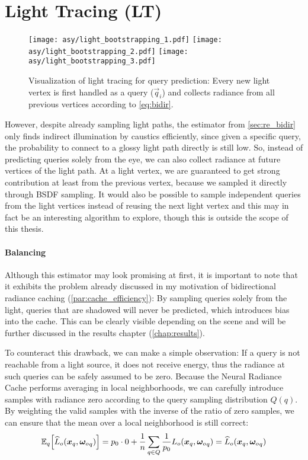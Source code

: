 \section{Light Tracing (LT)}
\label{sec:lt}
\begin{figure}[ht]
    \centering
    \texttt{[image: asy/light\_bootstrapping\_1.pdf]}
    \texttt{[image: asy/light\_bootstrapping\_2.pdf]}
    \texttt{[image: asy/light\_bootstrapping\_3.pdf]}
    \caption{Visualization of light tracing for query prediction: Every new light vertex is first handled as a query ($\vec{q}_i$) and collects radiance from all previous vertices according to \cref{eq:bidir}.}
    \label{fig:light_bootstrap}
\end{figure}
However, despite already sampling light paths, the estimator from \cref{sec:re_bidir} only finds indirect illumination by caustics efficiently, since given a specific query, the probability to connect to a glossy light path directly is still low. %
So, instead of predicting queries solely from the eye, we can also collect radiance at future vertices of the light path.
At a light vertex, we are guaranteed to get strong contribution at least from the previous vertex, because we sampled it directly through BSDF sampling.
It would also be possible to sample independent queries from the light vertices instead of reusing the next light vertex and this may in fact be an interesting algorithm to explore, though this is outside the scope of this thesis.

\paragraph{Balancing} Although this estimator may look promising at first, it is important to note that it exhibits the problem already discussed in my motivation of bidirectional radiance caching (\cref{par:cache_efficiency}):
By sampling queries solely from the light, queries that are shadowed will never be predicted, which introduces bias into the cache.
This can be clearly visible depending on the scene and will be further discussed in the results chapter (\cref{chap:results}). %

To counteract this drawback, we can make a simple observation:
If a query is not reachable from a light source, it does not receive energy, thus the radiance at such queries can be safely assumed to be zero.
Because the Neural Radiance Cache performs averaging in local neighborhoods, we can carefully introduce samples with radiance zero according to the query sampling distribution $Q(q)$.
By weighting the valid samples with the inverse of the ratio of zero samples, we can ensure that the mean over a local neighborhood is still correct:
\begin{equation}
\expectationvar{q}{{\widehat{L}_o}(\vec{x}_q, \wo_q)} = p_0 \cdot 0 + \frac{1}{n} \sum_{q \in Q} \frac{1}{p_0} L_o(\vec{x}_q, \wo_q) = \widehat{L}_o(\vec{x}_q, \wo_q)
\end{equation}

